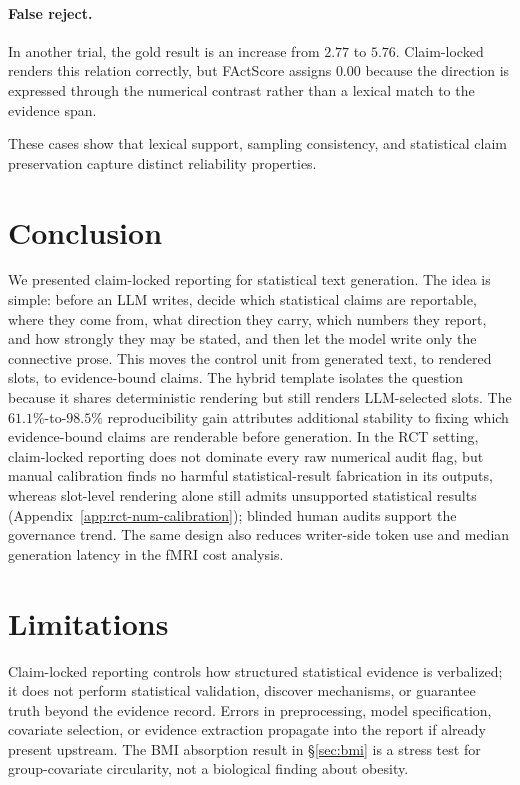 \documentclass[10pt,twocolumn]{article}
\begin{document}
\paragraph{False reject.} In another trial, the gold result is an increase from $2.77$ to $5.76$. Claim-locked renders this relation correctly, but FActScore assigns $0.00$ because the direction is expressed through the numerical contrast rather than a lexical match to the evidence span.

These cases show that lexical support, sampling consistency, and statistical claim preservation capture distinct reliability properties.

\section{Conclusion}

We presented claim-locked reporting for statistical text generation. The idea is simple: before an LLM writes, decide which statistical claims are reportable, where they come from, what direction they carry, which numbers they report, and how strongly they may be stated, and then let the model write only the connective prose. This moves the control unit from generated text, to rendered slots, to evidence-bound claims. The hybrid template isolates the question because it shares deterministic rendering but still renders LLM-selected slots. The $61.1\%$-to-$98.5\%$ reproducibility gain attributes additional stability to fixing which evidence-bound claims are renderable before generation. In the RCT setting, claim-locked reporting does not dominate every raw numerical audit flag, but manual calibration finds no harmful statistical-result fabrication in its outputs, whereas slot-level rendering alone still admits unsupported statistical results (Appendix~\ref{app:rct-num-calibration}); blinded human audits support the governance trend. The same design also reduces writer-side token use and median generation latency in the fMRI cost analysis.

\section*{Limitations}

Claim-locked reporting controls how structured statistical evidence is verbalized; it does not perform statistical validation, discover mechanisms, or guarantee truth beyond the evidence record. Errors in preprocessing, model specification, covariate selection, or evidence extraction propagate into the report if already present upstream. The BMI absorption result in \S\ref{sec:bmi} is a stress test for group-covariate circularity, not a biological finding about obesity.
\end{document}
